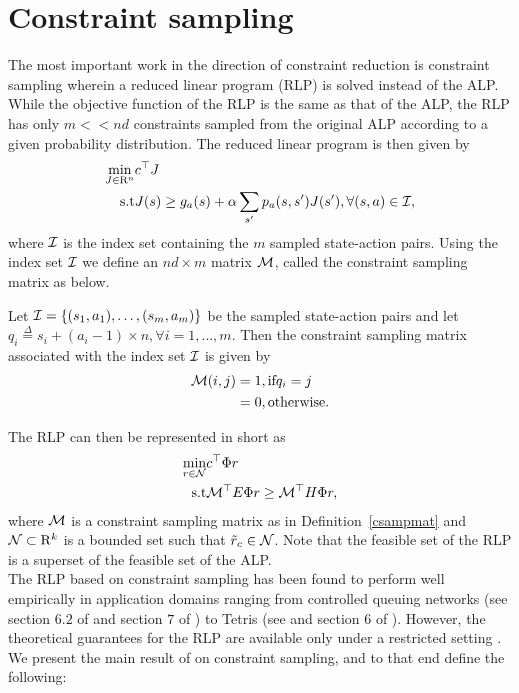 \documentclass[12pt,draftcls,onecolumn]{IEEEtran}
\begin{document}
\section{Constraint sampling}
The most important work in the direction of constraint reduction is constraint sampling \cite{CS} wherein a reduced linear program (RLP) is solved instead of the ALP. While the objective function of the RLP is the same as that of the ALP, the RLP has only $m<<nd$ constraints sampled from the original ALP according to a given probability distribution. The reduced linear program is then given by
\small
\begin{align}\label{rlp}
\min_{J\in \R^n} &c^\top J\nn\\
\text{s.t}\mb &J(s)\geq g_a(s)+\alpha\sum_{s'}p_a(s,s')J(s'), \mb\forall (s,a) \in \I,
\end{align}
\normalsize
where $\mathcal{I}$ is the index set containing the $m$ sampled state-action pairs. Using the index set $\mathcal{I}$ we define an $nd\times m$ matrix $\mathcal{M}$, called the constraint sampling matrix as below.
\begin{definition}\label{csampmat}
Let $\mathcal{I}=\{(s_1,a_1),\ldots,(s_m,a_m)\}$ be the sampled state-action pairs and let $q_i\stackrel{\Delta}{=}s_i+(a_i-1)\times n,\forall i=1,\ldots,m$. Then the constraint sampling matrix associated with the index set $\mathcal{I}$ is given by
\begin{align}
\mathcal{M}(i,j)&=1, \relax{ }\text{if}\relax{ } q_i=j\nonumber\\
&=0, \relax{ }\text{otherwise}.
\end{align}
\end{definition}
The RLP can then be represented in short as
\begin{align}\label{rlpshort}
\min_{r\in \N} &c^\top \Phi r\nn\\
\text{s.t}\mb & \M^\top E \Phi r \geq \M^\top H \Phi r,
\end{align}
where $\mathcal{M}$ is a constraint sampling matrix as in Definition~\ref{csampmat} and $\mathcal{N}\subset \mathrm{R}^k$ is a bounded set such that $\tilde{r}_c \in \mathcal{N}$. Note that the feasible set of the RLP is a superset of the feasible set of the ALP.\\
The RLP based on constraint sampling has been found to perform well empirically in application domains ranging from controlled queuing networks (see section $6.2$ of \cite{ALP} and section $7$ of \cite{SALP}) to Tetris (see \cite{CST} and section $6$ of \cite{SALP}). However, the theoretical guarantees for the RLP are available only under a restricted setting \cite{CS}. We present the main result of \cite{CS} on constraint sampling, and to that end define the following:
\end{document}
